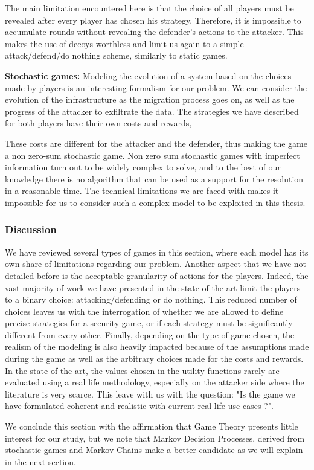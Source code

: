 The main limitation encountered here is that the choice of all players must be revealed after every player has chosen his strategy. Therefore, it is impossible to accumulate rounds without revealing the defender's actions to the attacker. This makes the use of decoys worthless and limit us again to a simple attack/defend/do nothing scheme, similarly to static games.

\textbf{Stochastic games:} Modeling the evolution of a system based on the choices made by players is an interesting formalism for our problem. We can consider the evolution of the infrastructure as the migration process goes on, as well as the progress of the attacker to exfiltrate the data. The strategies we have described for both players have their own costs and rewards, 

These costs are different for the attacker and the defender, thus making the game a non zero-sum stochastic game. Non zero sum stochastic games with imperfect information turn out to be widely complex to solve, and to the best of our knowledge there is no algorithm that can be used as a support for the resolution in a reasonable time. The technical limitations we are faced with makes it impossible for us to consider such a complex model to be exploited in this thesis.


\subsubsection{Discussion}
We have reviewed several types of games in this section, where each model has its own share of limitations regarding our problem. Another aspect that we have not detailed before is the acceptable granularity of actions for the players. Indeed, the vast majority of work we have presented in the state of the art limit the players to a binary choice: attacking/defending or do nothing. This reduced number of choices leaves us with the interrogation of whether we are allowed to define precise strategies for a security game, or if each strategy must be significantly different from every other.
Finally, depending on the type of game chosen, the realism of the modeling is also heavily impacted because of the assumptions made during the game as well as the arbitrary choices made for the costs and rewards.
In the state of the art, the values chosen in the utility functions rarely are evaluated using a real life methodology, especially on the attacker side where the literature is very scarce. This leave with us with the question: "Is the game we have formulated coherent and realistic with current real life use cases ?". 

We conclude this section with the affirmation that Game Theory presents little interest for our study, but we note that Markov Decision Processes, derived from stochastic games and Markov Chains make a better candidate as we will explain in the next section.



